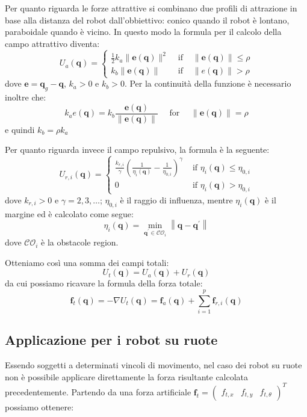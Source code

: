 \documentclass[Lau, binding=0.6cm, oneside]{sapthesis}
\begin{document}
Per quanto riguarda le forze attrattive si combinano due profili di attrazione in base alla distanza del robot dall'obbiettivo: conico quando il robot è lontano, paraboidale quando è vicino.
In questo modo la formula per il calcolo della campo attrattivo diventa:
\newline
$$
U_{a}(\boldsymbol{q})=\left\{\begin{array}{cll}
\frac{1}{2} k_{a}\|\boldsymbol{e}(\boldsymbol{q})\|^{2} & \text { if } & \|\boldsymbol{e}(\boldsymbol{q})\| \leq \rho \\
k_{b}\|\boldsymbol{e}(\boldsymbol{q})\| & \text { if } & \|e(\boldsymbol{q})\|>\rho
\end{array}\right.
$$
\newline
dove $\boldsymbol{e}=\boldsymbol{q}_{g}-\boldsymbol{q}$, $k_{a}>0$ e $k_{b}>0$.
Per la continuità della funzione è necessario inoltre che:
$$
k_{a} e(\boldsymbol{q})=k_{b} \frac{\boldsymbol{e}(\boldsymbol{q})}{\|\boldsymbol{e}(\boldsymbol{q})\|} \quad \text { for } \quad\|\boldsymbol{e}(\boldsymbol{q})\|=\rho
$$
\newline
e quindi $k_{b}=\rho k_{a}$

Per quanto riguarda invece il campo repulsivo, la formula è la seguente:
\newline
$$
U_{r, i}(\boldsymbol{q})=\left\{\begin{array}{ll}
\frac{k_{r, i}}{\gamma}\left(\frac{1}{\eta_{i}(\boldsymbol{q})}-\frac{1}{\eta_{0, i}}\right)^{\gamma} & \text { if } \eta_{i}(\boldsymbol{q}) \leq \eta_{0, i} \\
0 & \text { if } \eta_{i}(\boldsymbol{q})>\eta_{0, i}
\end{array}\right.
$$
\newline
dove $k_{r, i}>0$ e $\gamma=2,3, \ldots$; $\eta_{0, i}$ è il raggio di influenza, mentre $\eta_{i}(\boldsymbol{q})$ è il margine ed è calcolato come segue:
$$
\eta_{i}(\boldsymbol{q})=\min _{\boldsymbol{q}^{\prime} \in \mathcal{C O}_{i}}\left\|\boldsymbol{q}-\boldsymbol{q}^{\prime}\right\|
$$
\newline
dove $\mathcal{C O}_{i}$ è la obstacole region.

Otteniamo così una somma dei campi totali:
$$
U_{t}(\boldsymbol{q})=U_{a}(\boldsymbol{q})+U_{r}(\boldsymbol{q})
$$
da cui possiamo ricavare la formula della forza totale:
$$
\boldsymbol{f}_{t}(\boldsymbol{q})=-\nabla U_{t}(\boldsymbol{q})=\boldsymbol{f}_{a}(\boldsymbol{q})+\sum_{i=1}^{p} \boldsymbol{f}_{r, i}(\boldsymbol{q})
$$

\subsection{Applicazione per i robot su ruote}
Essendo soggetti a determinati vincoli di movimento, nel caso dei robot su ruote non è possibile applicare direttamente la forza risultante calcolata precedentemente.
Partendo da una forza artificiale $\boldsymbol{f}_{t}=\left(\begin{array}{lll}f_{t, x} & f_{t, y} & f_{t, \theta}\end{array}\right)^{T}$ possiamo ottenere:
\end{document}
